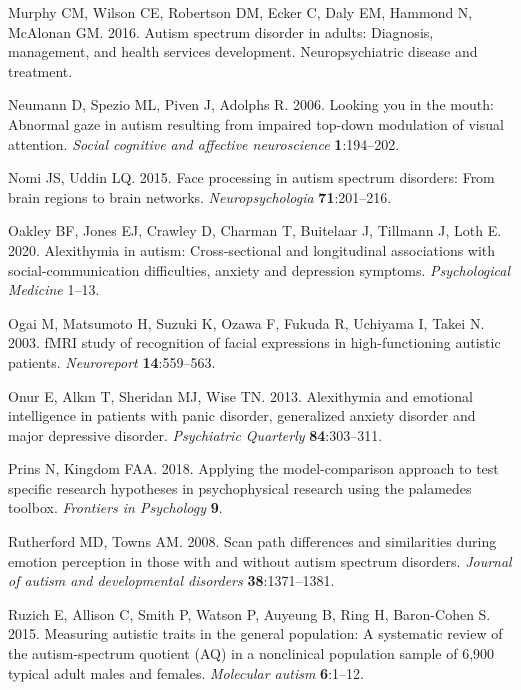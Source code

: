 \documentclass[
]{article}
\newlength{\cslhangindent}
\newlength{\cslentryspacingunit} %
\newenvironment{CSLReferences}[2] %
 {%
  \setlength{\parindent}{0pt}
  \ifodd #1
  \let\oldpar\par
  \def\par{\hangindent=\cslhangindent\oldpar}
  \fi
  \setlength{\parskip}{#2\cslentryspacingunit}
 }%
 {}
\begin{document}
\begin{CSLReferences}{1}{0}
\leavevmode{}%
Murphy CM, Wilson CE, Robertson DM, Ecker C, Daly EM, Hammond N, McAlonan GM. 2016. Autism spectrum disorder in adults: Diagnosis, management, and health services development. Neuropsychiatric disease and treatment.

\leavevmode{}%
Neumann D, Spezio ML, Piven J, Adolphs R. 2006. Looking you in the mouth: Abnormal gaze in autism resulting from impaired top-down modulation of visual attention. \emph{Social cognitive and affective neuroscience} \textbf{1}:194--202.

\leavevmode{}%
Nomi JS, Uddin LQ. 2015. Face processing in autism spectrum disorders: From brain regions to brain networks. \emph{Neuropsychologia} \textbf{71}:201--216.

\leavevmode{}%
Oakley BF, Jones EJ, Crawley D, Charman T, Buitelaar J, Tillmann J, Loth E. 2020. Alexithymia in autism: Cross-sectional and longitudinal associations with social-communication difficulties, anxiety and depression symptoms. \emph{Psychological Medicine} 1--13.

\leavevmode{}%
Ogai M, Matsumoto H, Suzuki K, Ozawa F, Fukuda R, Uchiyama I, Takei N. 2003. fMRI study of recognition of facial expressions in high-functioning autistic patients. \emph{Neuroreport} \textbf{14}:559--563.

\leavevmode{}%
Onur E, Alkın T, Sheridan MJ, Wise TN. 2013. Alexithymia and emotional intelligence in patients with panic disorder, generalized anxiety disorder and major depressive disorder. \emph{Psychiatric Quarterly} \textbf{84}:303--311.

\leavevmode{}%
Prins N, Kingdom FAA. 2018. Applying the model-comparison approach to test specific research hypotheses in psychophysical research using the palamedes toolbox. \emph{Frontiers in Psychology} \textbf{9}.

\leavevmode{}%
Rutherford MD, Towns AM. 2008. Scan path differences and similarities during emotion perception in those with and without autism spectrum disorders. \emph{Journal of autism and developmental disorders} \textbf{38}:1371--1381.

\leavevmode{}%
Ruzich E, Allison C, Smith P, Watson P, Auyeung B, Ring H, Baron-Cohen S. 2015. Measuring autistic traits in the general population: A systematic review of the autism-spectrum quotient (AQ) in a nonclinical population sample of 6,900 typical adult males and females. \emph{Molecular autism} \textbf{6}:1--12.


\end{CSLReferences}
\end{document}
